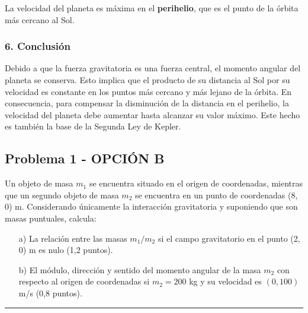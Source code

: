 \begin{cajaresultado}
La velocidad del planeta es máxima en el \textbf{perihelio}, que es el punto de la órbita más cercano al Sol.
\end{cajaresultado}

\subsubsection*{6. Conclusión}
\begin{cajaconclusion}
Debido a que la fuerza gravitatoria es una fuerza central, el momento angular del planeta se conserva. Esto implica que el producto de su distancia al Sol por su velocidad es constante en los puntos más cercano y más lejano de la órbita. En consecuencia, para compensar la disminución de la distancia en el perihelio, la velocidad del planeta debe aumentar hasta alcanzar su valor máximo. Este hecho es también la base de la Segunda Ley de Kepler.
\end{cajaconclusion}

\newpage

\subsection{Problema 1 - OPCIÓN B}
\label{subsec:1B_2010_jun_ord}
\begin{cajaenunciado}
Un objeto de masa $m_1$ se encuentra situado en el origen de coordenadas, mientras que un segundo objeto de masa $m_2$ se encuentra en un punto de coordenadas (8, 0) m. Considerando únicamente la interacción gravitatoria y suponiendo que son masas puntuales, calcula:
\begin{enumerate}
    \item[a)] La relación entre las masas $m_1/m_2$ si el campo gravitatorio en el punto (2, 0) m es nulo (1,2 puntos).
    \item[b)] El módulo, dirección y sentido del momento angular de la masa $m_2$ con respecto al origen de coordenadas si $m_2 = 200$ kg y su velocidad es $(0, 100)$ m/s (0,8 puntos).
\end{enumerate}
\end{cajaenunciado}
\hrule

